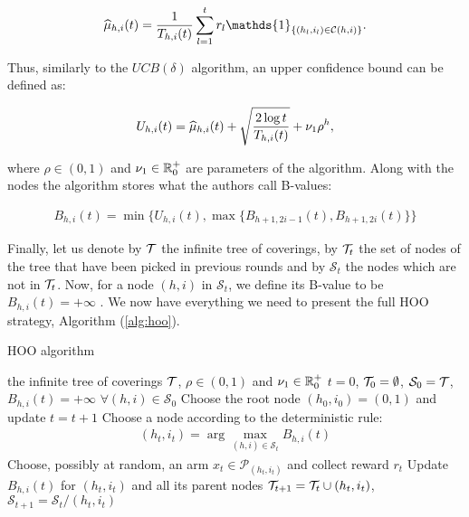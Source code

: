 \begin{align}
\wh{\mu}_{h,i}(t) = \frac{1}{T_{h,i}(t)}\sum_{l=1}^{t}r_l\mathds{1}_{\{(h_l, i_l)\in\mathcal{C}(h,i)\}}.
\end{align}

Thus, similarly to the $UCB(\delta)$ algorithm, an upper confidence bound can be defined as:

\begin{align}
U_{h,i}(t) = \widehat{\mu}_{h,i}(t) + \sqrt{\frac{2\log{t}}{T_{h,i}(t)}} + \nu_1\rho^h,
\end{align}

where $\rho\in(0,1)$ and $\nu_1\in\mathbb{R}^+_0$ are parameters of the algorithm. Along with the nodes the algorithm stores what the authors call B-values:

\begin{align}
B_{h,i}(t) = \min\{U_{h,i}(t), \max\{B_{h+1,2i-1}(t), B_{h+1,2i}(t)\}\}
\end{align}

Finally, let us denote by $\mathcal{T}$ the infinite tree of coverings, by $\mathcal{T}_t$ the set of nodes of the tree that have been picked in previous rounds and by $\mathcal{S}_t$ the nodes which are not in $\mathcal{T}_t$. Now, for a node $(h,i)$ in $\mathcal{S}_t$, we define
its B-value to be $B_{h,i}(t)=+\infty$ . We now have everything we need to present the full \gls{HOO} strategy, \ie Algorithm (\ref{alg:hoo}).

\begin{algorithm}[t]
	\caption{HOO algorithm}
	\label{alg:hoo}
	\begin{algorithmic}[1]
	 the infinite tree of coverings $\mathcal{T}$, $\rho\in(0,1)$ and $\nu_1\in\mathbb{R}^+_0$
	 $t=0$, $\mathcal{T}_0=\emptyset$, $\mathcal{S}_0=\mathcal{T}$, $B_{h,i}(t)=+\infty$ $\forall (h,i)\in\mathcal{S}_0$
	\State Choose the root node $(h_0, i_0)=(0,1)$ and update $t = t+1$
		\State Choose a node according to the deterministic rule:
		\begin{align}
		(h_t, i_t) = \arg\max_{(h, i)\in\mathcal{S}_t}B_{h,i}(t)
		\end{align}
		\State Choose, possibly at random, an arm $x_t\in\mathcal{P}_{(h_t, i_t)}$ and collect reward $r_t$
		\State Update $B_{h,i}(t)$ for $(h_t,i_t)$ and all its parent nodes
		\State $\mathcal{T}_{t+1}=\mathcal{T}_t\cup(h_t,i_t)$, $\mathcal{S}_{t+1}=\mathcal{S}_t/(h_t,i_t)$
	\EndFor
	\end{algorithmic}
\end{algorithm}

